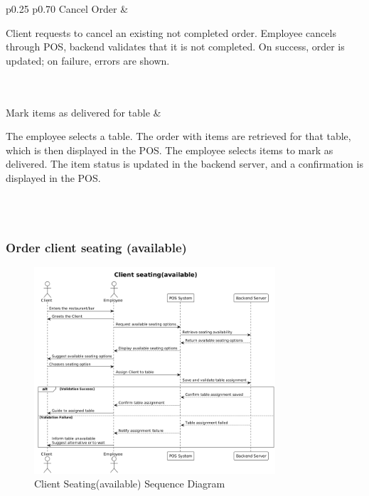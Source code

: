 \documentclass[]{VUMIFTemplateClass}
\begin{document}
\begin{longtable}{p{0.25\linewidth} p{0.70\linewidth}}
Cancel Order &
\begin{minipage}[t]{\linewidth}
Client requests to cancel an existing not completed order. Employee cancels through POS, backend validates that it is not completed. On success, order is updated; on failure, errors are shown.
\end{minipage} \\[6pt]
 \\[6pt]

Mark items as delivered for table &
\begin{minipage}[t]{\linewidth}
The employee selects a table. The order with items are retrieved for that table, which is then displayed in the POS. The employee selects items to mark as delivered. The item status is updated in the backend server, and a confirmation is displayed in the POS.
\end{minipage} \\[6pt]
 \\[6pt]

\end{longtable}

\subsubsection{Order client seating (available)}


\begin{figure}[H]
    \centering
    \includegraphics[width=0.8\textwidth]{images/diagrams/orders/order_client_seating_available.png}
    \caption{Client Seating(available) Sequence Diagram}
    \label{fig:client_seating_available_sequence}
\end{figure}
\end{document}
